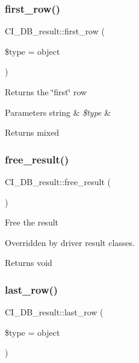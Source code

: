 \subsubsection{\texorpdfstring{first\+\_\+row()}{first\_row()}}
{\footnotesize\ttfamily C\+I\+\_\+\+D\+B\+\_\+result\+::first\+\_\+row (\begin{DoxyParamCaption}\item[{}]{\$type = {\ttfamily \textquotesingle{}object\textquotesingle{}} }\end{DoxyParamCaption})}

Returns the \char`\"{}first\char`\"{} row


\begin{DoxyParams}[1]{Parameters}
string & {\em \$type} & \\
\hline
\end{DoxyParams}
\begin{DoxyReturn}{Returns}
mixed 
\end{DoxyReturn}
\mbox{\label{class_c_i___d_b__result_a70bf721dd584979a3c54c3fe9059627c}} 
\subsubsection{\texorpdfstring{free\+\_\+result()}{free\_result()}}
{\footnotesize\ttfamily C\+I\+\_\+\+D\+B\+\_\+result\+::free\+\_\+result (\begin{DoxyParamCaption}{ }\end{DoxyParamCaption})}

Free the result

Overridden by driver result classes.

\begin{DoxyReturn}{Returns}
void 
\end{DoxyReturn}
\mbox{\label{class_c_i___d_b__result_ae008a8382dc6171e536870d79c1995ec}} 
\subsubsection{\texorpdfstring{last\+\_\+row()}{last\_row()}}
{\footnotesize\ttfamily C\+I\+\_\+\+D\+B\+\_\+result\+::last\+\_\+row (\begin{DoxyParamCaption}\item[{}]{\$type = {\ttfamily \textquotesingle{}object\textquotesingle{}} }\end{DoxyParamCaption})}

